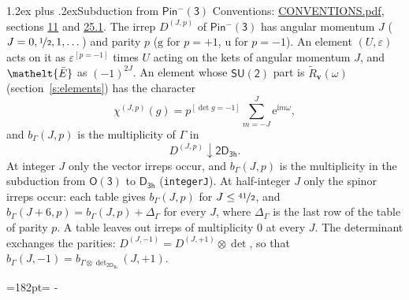 \documentclass[10pt,a4paper]{article}
\makeatletter
\renewcommand\section{\@startsection{section}{1}{\z@}{-3ex plus -1ex minus -.2ex}%
  {1.2ex plus .2ex}{\normalfont\large\sffamily\bfseries\color{parttitle}}}
\newcommand{\needspace}[1]{\par\penalty-100\begingroup\dimen0=#1\relax\dimen2=\pagegoal
  \advance\dimen2-\pagetotal\ifdim\dimen0>\dimen2\relax\ifdim\dimen2>0pt\vfil\break\fi\fi
  \endgroup}
\numberwithin{equation}{section}
\newcommand{\eltfont}[1]{{\let\sigma\eltsigma\mathelt{#1}}}
\newcommand{\grp}[1]{\mathsf{#1}}
\newcommand{\elt}[1]{\eltfont{#1}}
\newcommand{\ptag}[1]{\mathrm{#1}}
\newcommand{\iverson}[1]{[#1]}
\newcommand{\restr}[2]{#1\!\downarrow#2}
\newcommand{\vv}{\mathbf{v}}
\newcommand{\iunit}{\mathrm{i}}
\newcommand{\expe}{\mathrm{e}}
\newcommand{\irrJp}[2]{D^{(#1,#2)}}
\newcommand{\irrprod}{\otimes}
\newcommand{\barred}[1]{\bar{#1}}
\newcommand{\lift}[1]{\tilde{#1}}
\makeatother
\begin{document}
\section{Subduction from \texorpdfstring{$\grp{Pin^{-}(3)}$}{Pin(3)}}\label{s:subduction_parent}
Conventions: \href{../../CONVENTIONS.pdf}{CONVENTIONS.pdf}, sections \href{../../../rotation/CONVENTIONS.pdf\#conv.11}{11} and \href{../../CONVENTIONS.pdf\#conv.25.1}{25.1}.
\leavevmode\label{n:index.J}\label{n:index.parity}\label{n:irrep.o3}The irrep $\irrJp{J}{p}$ of \href{Pinminus3.pdf}{$\grp{Pin^{-}(3)}$} has angular momentum $J$ ($J = 0, \nicefrac{1}{2}, 1, \dots$) and parity $p$ ($\ptag{g}$ for $p = +1$, $\ptag{u}$ for $p = -1$). An element $(U, \varepsilon)$ acts on it as $\varepsilon^{[p = -1]}$ times $U$ acting on the kets of angular momentum $J$, and $\elt{\barred{E}}$ as $(-1)^{2J}$. \label{n:function.character.parent}\label{n:function.multiplicity}An element whose $\grp{SU(2)}$ part is $\lift{R}_{\vv}(\omega)$ (section~\ref{s:elements}) has the character
\begin{equation}\label{e:chi}\chi^{(J,p)}(g) = p^{\iverson{\det g = -1}}\sum_{m=-J}^{J} \expe^{\iunit m\omega},\end{equation}
and $b_\Gamma(J, p)$ is the multiplicity of $\Gamma$ in
\begin{equation}\label{e:parent}\restr{\irrJp{J}{p}}{\grp{2D_{3h}}}.\end{equation}
At integer $J$ only the vector irreps occur, and $b_\Gamma(J, p)$ is the multiplicity in the subduction from $\grp{O(3)}$ to \href{../../../rotation/data/pdf/D3h.pdf}{$\grp{D_{3h}}$} (\texttt{integerJ}). \label{n:index.increment}At half-integer $J$ only the spinor irreps occur: each table gives $b_\Gamma(J, p)$ for $J \le \nicefrac{41}{2}$, and $b_\Gamma(J + 6, p) = b_\Gamma(J, p) + \Delta_\Gamma$ for every $J$, where $\Delta_\Gamma$ is the last row of the table of parity $p$. A table leaves out irreps of multiplicity 0 at every $J$.
\leavevmode\label{n:operator.determinant.character}The determinant exchanges the parities: $\irrJp{J}{-1} = \irrJp{J}{+1} \irrprod \det$, so that $b_\Gamma(J, -1) = b_{\Gamma \irrprod \det_{\grp{2D_{3h}}}}(J, +1)$.
\needspace{182pt}
\end{document}
